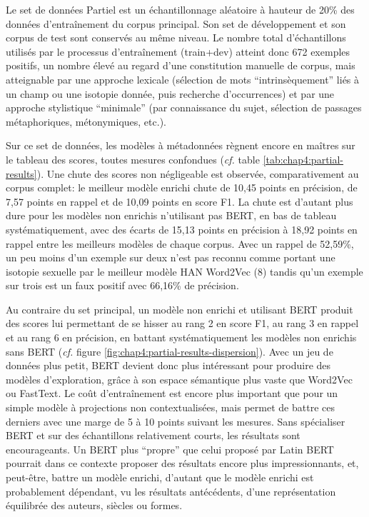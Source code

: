 Le set de données Partiel est un échantillonnage aléatoire à hauteur de 20\% des données d'entraînement du corpus principal. Son set de développement et son corpus de test sont conservés au même niveau. Le nombre total d'échantillons utilisés par le processus d'entraînement (train+dev) atteint donc 672 exemples positifs, un nombre élevé au regard d'une constitution manuelle de corpus, mais atteignable par une approche lexicale (sélection de mots \enquote{intrinsèquement} liés à un champ ou une isotopie donnée, puis recherche d'occurrences) et par une approche stylistique \enquote{minimale} (par connaissance du sujet, sélection de passages métaphoriques, métonymiques, etc.).

Sur ce set de données, les modèles à métadonnées règnent encore en maîtres sur le tableau des scores, toutes mesures confondues (\textit{cf.} table \ref{tab:chap4:partial-results}). Une chute des scores non négligeable est observée, comparativement au corpus complet: le meilleur modèle enrichi chute de 10,45 points en précision, de 7,57 points en rappel et de 10,09 points en score F1. La chute est d'autant plus dure pour les modèles non enrichis n'utilisant pas BERT, en bas de tableau systématiquement, avec des écarts de 15,13 points en précision à 18,92 points en rappel entre les meilleurs modèles de chaque corpus. Avec un rappel de 52,59\%, un peu moins d'un exemple sur deux n'est pas reconnu comme portant une isotopie sexuelle par le meilleur modèle HAN Word2Vec (8) tandis qu'un exemple sur trois est un faux positif avec 66,16\% de précision.


Au contraire du set principal, un modèle non enrichi et utilisant BERT produit des scores lui permettant de se hisser au rang 2 en score F1, au rang 3 en rappel et au rang 6 en précision, en battant systématiquement les modèles non enrichis sans BERT (\textit{cf.} figure \ref{fig:chap4:partial-results-dispersion}). Avec un jeu de données plus petit, BERT devient donc plus intéressant pour produire des modèles d'exploration, grâce à son espace sémantique plus vaste que Word2Vec ou FastText. Le coût d'entraînement est encore plus important que pour un simple modèle à projections non contextualisées, mais permet de battre ces derniers avec une marge de 5 à 10 points suivant les mesures. Sans spécialiser BERT et sur des échantillons relativement courts, les résultats sont encourageants. Un BERT plus \enquote{propre} que celui proposé par Latin BERT pourrait dans ce contexte proposer des résultats encore plus impressionnants, et, peut-être, battre un modèle enrichi, d'autant que le modèle enrichi est probablement dépendant, vu les résultats antécédents, d'une représentation équilibrée des auteurs, siècles ou formes.



